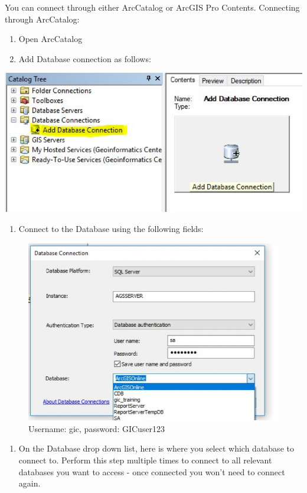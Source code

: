 \documentclass[]{book}
\providecommand{\tightlist}{%
  \setlength{\itemsep}{0pt}\setlength{\parskip}{0pt}}
\theoremstyle{definition}
\theoremstyle{definition}
\theoremstyle{definition}
\theoremstyle{remark}
\begin{document}
You can connect through either ArcCatalog or ArcGIS Pro Contents.
Connecting through ArcCatalog:

\begin{enumerate}
\def\labelenumi{\arabic{enumi}.}
\item
  Open ArcCatalog
\item
  Add Database connection as follows:
\end{enumerate}

\begin{center}\includegraphics[width=0.7\linewidth]{img/fig43_arcgis5} \end{center}

\begin{enumerate}
\def\labelenumi{\arabic{enumi}.}
\setcounter{enumi}{2}
\tightlist
\item
  Connect to the Database using the following fields:
\end{enumerate}

\begin{figure}

{\centering \includegraphics[width=0.7\linewidth]{img/fig43_arcgis6} 

}

\caption{Username: gic, password: GICuser123}\label{fig:fig411f}
\end{figure}

\begin{enumerate}
\def\labelenumi{\arabic{enumi}.}
\setcounter{enumi}{3}
\tightlist
\item
  On the Database drop down list, here is where you select which
  database to connect to. Perform this step multiple times to connect to
  all relevant databases you want to access - once connected you won't
  need to connect again.
\end{enumerate}
\end{document}
